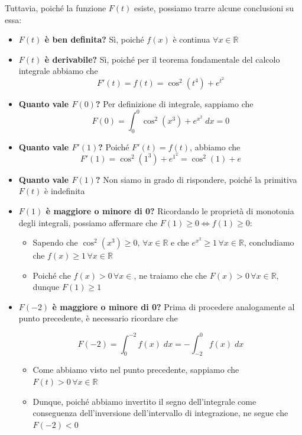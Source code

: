 \documentclass[a4paper, 12pt]{report}
\begin{document}
    Tuttavia, poiché la funzione $F(t)$ esiste, possiamo trarre alcune conclusioni su essa:
    \begin{itemize}
        \item \textbf{$F(t)$ è ben definita?} Sì, poiché $f(x)$ è continua $\forall x \in \mathbb{R}$
        \item \textbf{$F(t)$ è derivabile?} Sì, poiché per il teorema fondamentale del calcolo integrale abbiamo che
        \[ F'(t) = f(t) = \cos^2(t^4)+e^{t^2}\]
        \item \textbf{Quanto vale $F(0)$?} Per definizione di integrale, sappiamo che
        \[ F(0) = \int_{0}^{0} \cos^2(x^3)+e^{x^2} \; dx = 0\]
        \item \textbf{Quanto vale $F'(1)$?} Poiché $F'(t) = f(t)$, abbiamo che
        \[ F'(1) = \cos^2(1^3)+e^{1^2} = \cos^2(1)+e\]
        \item \textbf{Quanto vale $F(1)$?} Non siamo in grado di rispondere, poiché la primitiva $F(t)$ è indefinita
        \item \textbf{$F(1)$ è maggiore o minore di 0?}
        Ricordando le proprietà di monotonia degli integrali, possiamo affermare che $F(1) \geq 0 \Longleftrightarrow f(1) \geq 0$:
        \begin{itemize}
            \item Sapendo che $\cos^2(x^3) \geq 0, \, \forall x \in \mathbb{R}$ e che $e^{x^2} \geq 1 \, \forall x \in \mathbb{R}$, concludiamo che $f(x) \geq 1\, \forall x \in \mathbb{R}$
            \item Poiché che $f(x) > 0\, \forall x \in \mathbb{}$, ne traiamo che che $F(x) > 0\, \forall x \in \mathbb{R}$, dunque $F(1) \geq 1$
        \end{itemize}
        \item \textbf{$F(-2)$ è maggiore o minore di 0?} Prima di procedere analogamente al punto precedente, è necessario ricordare che
        
        \[ F(-2) = \int_{0}^{-2} f(x) \; dx = - \int_{-2}^{0} f(x) \; dx\]
        
        \begin{itemize}
            \item Come abbiamo visto nel punto precedente, sappiamo che $F(t) > 0\, \forall x \in \mathbb{R}$
            \item Dunque, poiché abbiamo invertito il segno dell'integrale come conseguenza dell'inversione dell'intervallo di integrazione, ne segue che $F(-2) < 0$
        \end{itemize}
        

\end{itemize}
\end{document}
